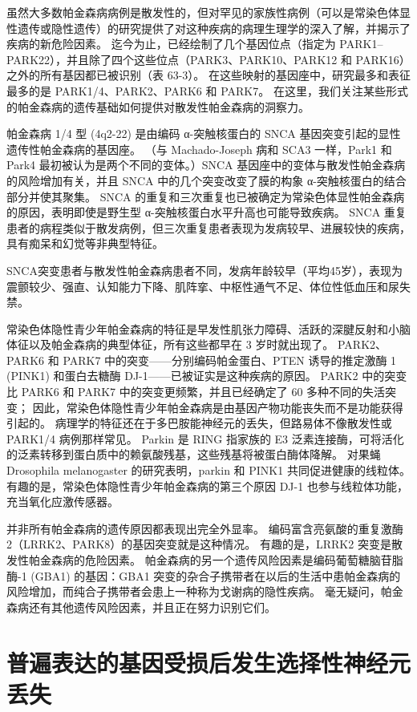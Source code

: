 虽然大多数帕金森病病例是散发性的，但对罕见的家族性病例（可以是常染色体显性遗传或隐性遗传）的研究提供了对这种疾病的病理生理学的深入了解，并揭示了疾病的新危险因素。 迄今为止，已经绘制了几个基因位点（指定为 PARK1–PARK22），并且除了四个这些位点（PARK3、PARK10、PARK12 和 PARK16）之外的所有基因都已被识别（表 63-3）。 在这些映射的基因座中，研究最多和表征最多的是 PARK1/4、PARK2、PARK6 和 PARK7。 在这里，我们关注某些形式的帕金森病的遗传基础如何提供对散发性帕金森病的洞察力。

帕金森病 1/4 型 (4q2-22) 是由编码 α-突触核蛋白的 SNCA 基因突变引起的显性遗传性帕金森病的基因座。 （与 Machado-Joseph 病和 SCA3 一样，Park1 和 Park4 最初被认为是两个不同的变体。）SNCA 基因座中的变体与散发性帕金森病的风险增加有关，并且 SNCA 中的几个突变改变了膜的构象 α-突触核蛋白的结合部分并使其聚集。 SNCA 的重复和三次重复也已被确定为常染色体显性帕金森病的原因，表明即使是野生型 α-突触核蛋白水平升高也可能导致疾病。 SNCA 重复患者的病程类似于散发病例，但三次重复患者表现为发病较早、进展较快的疾病，具有痴呆和幻觉等非典型特征。

SNCA突变患者与散发性帕金森病患者不同，发病年龄较早（平均45岁），表现为震颤较少、强直、认知能力下降、肌阵挛、中枢性通气不足、体位性低血压和尿失禁。


常染色体隐性青少年帕金森病的特征是早发性肌张力障碍、活跃的深腱反射和小脑体征以及帕金森病的典型体征，所有这些都早在 3 岁时就出现了。 PARK2、PARK6 和 PARK7 中的突变——分别编码帕金蛋白、PTEN 诱导的推定激酶 1 (PINK1) 和蛋白去糖酶 DJ-1——已被证实是这种疾病的原因。 PARK2 中的突变比 PARK6 和 PARK7 中的突变更频繁，并且已经确定了 60 多种不同的失活突变； 因此，常染色体隐性青少年帕金森病是由基因产物功能丧失而不是功能获得引起的。 病理学的特征还在于多巴胺能神经元的丢失，但路易体不像散发性或 PARK1/4 病例那样常见。 Parkin 是 RING 指家族的 E3 泛素连接酶，可将活化的泛素转移到蛋白质中的赖氨酸残基，这些残基将被蛋白酶体降解。 对果蝇 Drosophila melanogaster 的研究表明，parkin 和 PINK1 共同促进健康的线粒体。 有趣的是，常染色体隐性青少年帕金森病的第三个原因 DJ-1 也参与线粒体功能，充当氧化应激传感器。

并非所有帕金森病的遗传原因都表现出完全外显率。 编码富含亮氨酸的重复激酶 2（LRRK2、PARK8）的基因突变就是这种情况。 有趣的是，LRRK2 突变是散发性帕金森病的危险因素。 帕金森病的另一个遗传风险因素是编码葡萄糖脑苷脂酶-1 (GBA1) 的基因：GBA1 突变的杂合子携带者在以后的生活中患帕金森病的风险增加，而纯合子携带者会患上一种称为戈谢病的隐性疾病。 毫无疑问，帕金森病还有其他遗传风险因素，并且正在努力识别它们。

\section{普遍表达的基因受损后发生选择性神经元丢失}

